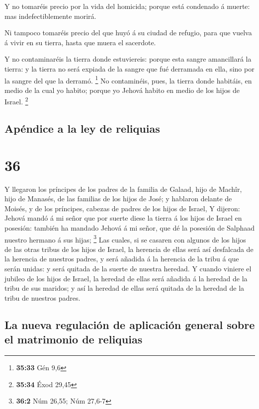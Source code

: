  Y no tomaréis precio por la vida del homicida; porque
está condenado á muerte: mas indefectiblemente morirá.

 Ni tampoco tomaréis precio del que huyó á su ciudad de
refugio, para que vuelva á vivir en su tierra, hasta que muera el
sacerdote.

 Y no contaminaréis la tierra donde estuviereis: porque
esta sangre amancillará la tierra: y la tierra no será expiada de la
sangre que fué derramada en ella, sino por la sangre del que la derramó.
\footnote{\textbf{35:33} Gén 9,6}  No contaminéis, pues,
la tierra donde habitáis, en medio de la cual yo habito; porque yo
Jehová habito en medio de los hijos de Israel. \footnote{\textbf{35:34}
  Éxod 29,45}

\hypertarget{apuxe9ndice-a-la-ley-de-reliquias}{%
\subsection{Apéndice a la ley de
reliquias}\label{apuxe9ndice-a-la-ley-de-reliquias}}

\hypertarget{section-35}{%
\section{36}\label{section-35}}

 Y llegaron los príncipes de los padres de la familia de
Galaad, hijo de Machîr, hijo de Manasés, de las familias de los hijos de
José; y hablaron delante de Moisés, y de los príncipes, cabezas de
padres de los hijos de Israel,  Y dijeron: Jehová mandó á
mi señor que por suerte diese la tierra á los hijos de Israel en
posesión: también ha mandado Jehová á mi señor, que dé la posesión de
Salphaad nuestro hermano á sus hijas; \footnote{\textbf{36:2} Núm 26,55;
  Núm 27,6-7}  Las cuales, si se casaren con algunos de
los hijos de las otras tribus de los hijos de Israel, la herencia de
ellas será así desfalcada de la herencia de nuestros padres, y será
añadida á la herencia de la tribu á que serán unidas: y será quitada de
la suerte de nuestra heredad.  Y cuando viniere el jubileo
de los hijos de Israel, la heredad de ellas será añadida á la heredad de
la tribu de sus maridos; y así la heredad de ellas será quitada de la
heredad de la tribu de nuestros padres.

\hypertarget{la-nueva-regulaciuxf3n-de-aplicaciuxf3n-general-sobre-el-matrimonio-de-reliquias}{%
\subsection{La nueva regulación de aplicación general sobre el
matrimonio de
reliquias}\label{la-nueva-regulaciuxf3n-de-aplicaciuxf3n-general-sobre-el-matrimonio-de-reliquias}}


